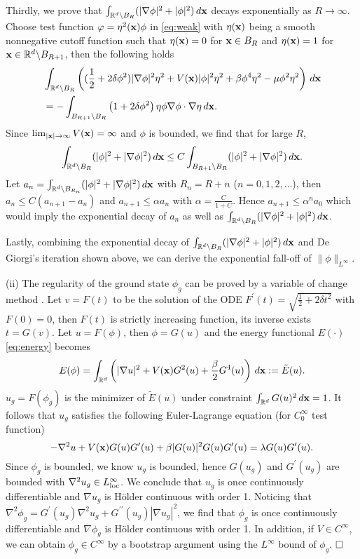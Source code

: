 \documentclass{elsarticle}
\newcommand{\be}{\begin{equation}}
\newcommand{\ee}{\end{equation}}
\newcommand{\bx}{{\bf x} }
\renewcommand{\ldots}{\dotsc}
\begin{document}
Thirdly, we prove that $\int_{\Bbb R^d\backslash B_R}(|\nabla\phi|^2+|\phi|^2)\,d\bx$ decays exponentially as $R\to\infty$. Choose test function
$\varphi=\eta^2(\bx)\phi$ in \eqref{eq:weak} with $\eta(\bx)$ being a smooth nonnegative cutoff function such that $\eta(\bx)=0$ for
$\bx\in B_R$ and $\eta(\bx)=1$ for $\bx\in \Bbb R^d\backslash B_{R+1}$, then the following holds
\begin{align*}
&\int_{\Bbb R^d\backslash B_R}\left((\frac12+2\delta\phi^2)|\nabla\phi|^2\eta^2+V(\bx)|\phi|^2\eta^2+\beta\phi^4\eta^2-\mu\phi^2\eta^2\right)\,d\bx\\
&=-\int_{B_{R+1}\backslash B_R} \left(1+2\delta\phi^2\right)\eta\phi\nabla\phi\cdot\nabla\eta\,d\bx.
\end{align*}
Since $\lim_{|\bx|\to\infty}V(\bx)=\infty$ and $\phi$ is bounded, we find that for large $R$,
\be
\int_{\Bbb R^d\backslash B_R}(|\phi|^2+|\nabla\phi|^2)\,d\bx\leq C\int_{B_{R+1}\backslash B_R}(|\phi|^2+|\nabla\phi|^2)\,d\bx.
\ee
Let $a_n=\int_{\Bbb R^d\backslash B_{R_n}}(|\phi|^2+|\nabla\phi|^2)\,d\bx$ with $R_n=R+n$ ($n=0,1,2,\ldots$), then
$a_{n}\leq C(a_{n+1}-a_n)$ and $a_{n+1}\leq \alpha a_n$ with $\alpha=\frac{C}{1+C}$. Hence $a_{n+1}\leq \alpha^n a_0$ which would imply the
exponential decay of $a_n$ as well as $\int_{\Bbb R^d\backslash B_R}(|\nabla\phi|^2+|\phi|^2)\,d\bx$.

Lastly, combining the exponential decay of $\int_{\Bbb R^d\backslash B_R}(|\nabla\phi|^2+|\phi|^2)\,d\bx$ and De Giorgi's iteration shown above,
we can derive the exponential fall-off of $\|\phi\|_{L^\infty}$.

(ii) The regularity of the ground state $\phi_g$ can be proved by a variable of change method \cite{Liu,ColinM}.
Let $v=F(t)$ to be the solution of the ODE $F^\prime(t)=\sqrt{\frac12+
2\delta t^2}$
with $F(0)=0$, then $F(t)$ is strictly
 increasing function, its inverse exists $t=G(v)$. Let $u=F(\phi)$, then $\phi=G(u)$ and the energy functional $E(\cdot)$ \eqref{eq:energy}
 becomes
 \be
 E(\phi)=\int_{\Bbb R^d}\left(|\nabla u|^2+V(\bx)G^2(u)+\frac{\beta}{2} G^4(u)\right)\,d\bx:=\tilde{E}(u).
 \ee
 $u_g=F(\phi_g)$ is the minimizer of $\tilde{E}(u)$ under constraint $\int_{\Bbb R^d}G(u)^2\,d\bx=1$. It follows that
 $u_g$ satisfies the following Euler-Lagrange equation (for $C_0^\infty$ test function)
 \be
 -\nabla^2 u+V(\bx)G(u)G^\prime(u)+\beta |G(u)|^2G(u)G^\prime(u)=\lambda G(u)G^\prime(u).
 \ee
 Since $\phi_g$ is bounded, we know $u_g$ is bounded, hence $G(u_g)$ and $G^\prime(u_g)$ are bounded with $\nabla ^2u_g\in L^\infty_{\rm loc}$.
 We conclude that $u_g$ is once continuously differentiable and
 $\nabla u_g$ is H\"older continuous with order 1.
  Noticing that $\nabla^2\phi_g=G^\prime(u_g)\nabla^2 u_g+G^{\prime\prime}(u_g)|\nabla u_g|^2$,
 we find  that $\phi_g$ is once continuously differentiable and
 $\nabla \phi_g$ is H\"older continuous with order 1.
  In addition, if $V\in C^\infty$, we can obtain  $\phi_g\in C^\infty$ by a bootstrap argument using the $L^\infty$ bound of $\phi_g$. $\hfill\Box$
\end{document}
